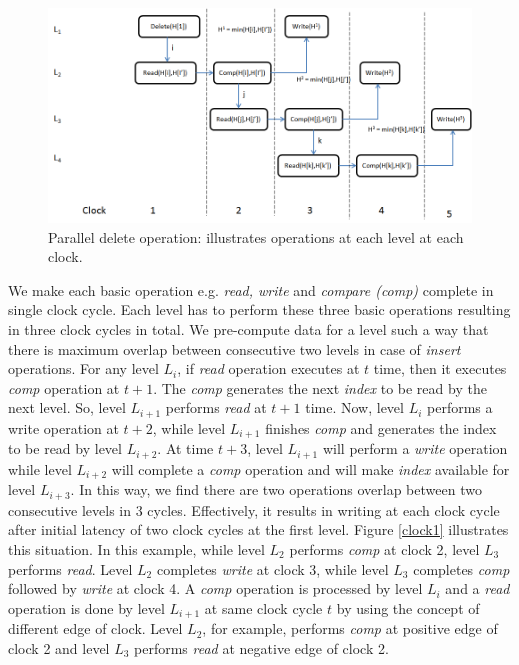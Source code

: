 \documentclass[10pt, conference, compsocconf]{IEEEtran}
\begin{document}
\begin{figure}[!ht]
  \centering
  \includegraphics[width=12cm]{Figures/clock2.png}
      \caption{Parallel delete operation: illustrates operations at each level at each clock.  }
    \label{clock2}
\end{figure}

We make each basic operation e.g. {\it read, write} and {\it compare (comp)} complete in single clock cycle.
Each level has to perform these three basic operations resulting in three clock cycles in total.
We pre-compute data for a level such a way that there is maximum overlap between consecutive two levels in case of {\it insert} operations.
For any level $L_i$, if {\it read} operation executes at $t$ time, then it executes {\it comp} operation at $t+1$.
The {\it comp} generates the next {\it index} to be read by the next level.
So, level $L_{i+1}$ performs {\it read} at $t+1$ time.
Now, level $L_i$ performs a write operation at $t+2$, while level $L_{i+1}$ finishes {\it comp} and generates the index to be read by level $L_{i+2}$.
At time $t+3$, level $L_{i+1}$ will perform a {\it write} operation while level $L_{i+2}$ will complete a {\it comp} operation and will make {\it index} available for level $L_{i+3}$.
In this way, we find there are two operations overlap between two consecutive levels in 3 cycles.
Effectively, it results in writing at each clock cycle after initial latency of two clock cycles at the first level.
Figure \ref{clock1} illustrates this situation.
In this example, while level $L_2$ performs {\it comp} at clock 2, level $L_3$ performs {\it read}.
Level $L_2$ completes {\it write} at clock 3, while level $L_3$ completes {\it comp} followed by {\it write} at clock 4.
A {\it comp} operation is processed by level $L_i$ and a {\it read} operation is done by level $L_{i+1}$ at same clock cycle $t$ by using the concept of different edge of clock.
Level $L_2$, for example, performs {\it comp} at positive edge of clock 2 and level $L_3$ performs {\it read} at negative edge of clock 2.
\end{document}
